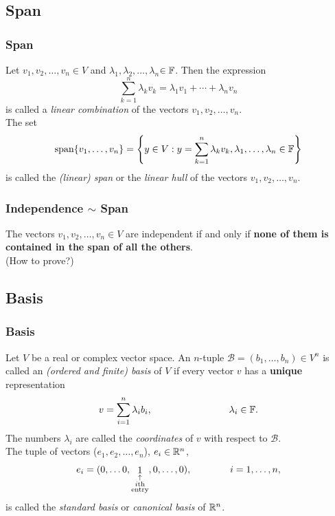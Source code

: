 \documentclass{beamer}
\renewcommand{\emph}[1]{{\color{Turquoise3}\textsl{#1}}}
\newcommand{\myseries}[2]{$#1_1,#1_2,\dots,#1_#2$}
\begin{document}
\subsection{Span}
\begin{frame}
    \frametitle{Span}
    Let \myseries{v}{n}$\in V$ and \myseries{\lambda}{n}$\in\mathbb{F}$. Then the expression
    \begin{equation*}
        \sum_{k=1}^{n}\lambda_kv_k=\lambda_1v_1+\cdots+\lambda_nv_n
    \end{equation*}
    is called a \emph{linear combination} of the vectors \myseries{v}{n}.\\
    The set
    \[\text{span}\{v_1,\ldots,v_n\}=\left\{y\in V:y=\sum_{k=1}^{n}\lambda_kv_k,\lambda_1,\ldots,\lambda_n\in\mathbb{F}\right\}\]
    is called the \emph{(linear) span} or the \emph{linear hull} of the vectors \myseries{v}{n}.

\end{frame}

\begin{frame}
    \frametitle{Independence $\sim$ Span}
    The vectors \myseries{v}{n}$\in V$ are independent if and only if
    \textbf{none of them is contained in the span of all the others}.
    \\[15pt]
    (How to prove?)
\end{frame}

\subsection{Basis}
\begin{frame}
    \frametitle{Basis}
    Let $V$ be a real or complex vector space. An $n$-tuple $\mathcal{B}=(b_1,\ldots,b_n)\in V^n$ is called an \emph{(ordered and finite) basis} of $V$
    if every vector $v$ has a \textbf{unique} representation
    \begin{equation}
        v=\sum_{i=1}^{n}\lambda_ib_i,\qquad\qquad\qquad\qquad\lambda_i\in\mathbb{F}.\label{basis}
    \end{equation}
    The numbers $\lambda_i$ are called the \emph{coordinates} of $v$ with respect to $\mathcal{B}$.
    \\[15pt]
    The tuple of vectors (\myseries{e}{n}), $e_i\in\mathbb{R}^n$,
    \begin{equation*}
        e_i=(0,\ldots 0,\mathop{1}_{\begin{subarray}{c}
                \uparrow\\  i\text{th}\\ \text{entry}\end{subarray}},0,\ldots,0),\qquad\qquad i=1,\ldots,n,
    \end{equation*}
    is called the \emph{standard basis} or \emph{canonical basis} of $\mathbb{R}^n$.
\end{frame}
\end{document}
